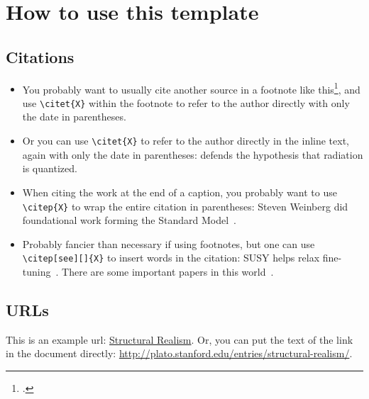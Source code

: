 \section{How to use this template}
\label{sec:example}


\subsection{Citations}

\begin{itemize}

    \item
    You probably want to usually cite another source in a footnote like this\footnote{
        \citet{1905.Einstein.photoelectric-effect}.
    },
    and use \verb$\citet{X}$ within the footnote to refer to the author directly with only the date in parentheses.

    \item
    Or you can use \verb$\citet{X}$ to refer to the author directly in the inline text, again with only the date in parentheses:
    \citet{1905.Einstein.photoelectric-effect} defends the hypothesis that radiation is quantized.

    \item
    When citing the work at the end of a caption, you probably want to
    use \verb$\citep{X}$ to wrap the entire citation in parentheses:
    Steven Weinberg did foundational work forming the
    Standard Model~\citep{1967.Weinberg.A_model_of_leptons}.

    \item
    Probably fancier than necessary if using footnotes,
    but one can use \verb$\citep[see][]{X}$ to insert words in the citation:
    SUSY helps relax fine-tuning~\citep[see][]{1997.Martin.SUSY-primer}.
    There are some important papers in this
    world~\citep[\emph{e.g.}][]{1905.Einstein.photoelectric-effect}.

\end{itemize}


\subsection{URLs}

This is an example url: \href{http://plato.stanford.edu/entries/structural-realism/}{Structural Realism}.
Or, you can put the text of the link in the document directly:
\url{http://plato.stanford.edu/entries/structural-realism/}.


